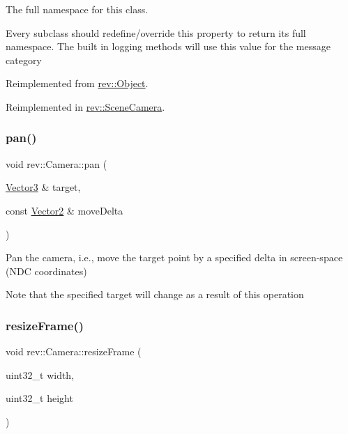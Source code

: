The full namespace for this class. 

Every subclass should redefine/override this property to return its full namespace. The built in logging methods will use this value for the message category 

Reimplemented from \mbox{\hyperlink{classrev_1_1_object_aaeb638d3e10f361c56c211a318a27f3d}{rev\+::\+Object}}.



Reimplemented in \mbox{\hyperlink{classrev_1_1_scene_camera_a8d2a68f15a75323bd1d9a5d96c7a09bc}{rev\+::\+Scene\+Camera}}.

\mbox{\label{classrev_1_1_camera_a5c894cef5f6e9f7e93be757fcceff737}} 
\subsubsection{\texorpdfstring{pan()}{pan()}}
{\footnotesize\ttfamily void rev\+::\+Camera\+::pan (\begin{DoxyParamCaption}\item[{\mbox{\hyperlink{classrev_1_1_vector}{Vector3}} \&}]{target,  }\item[{const \mbox{\hyperlink{classrev_1_1_vector}{Vector2}} \&}]{move\+Delta }\end{DoxyParamCaption})}



Pan the camera, i.\+e., move the target point by a specified delta in screen-\/space (N\+DC coordinates) 

Note that the specified target will change as a result of this operation \mbox{\label{classrev_1_1_camera_a38127b7e39468bb9116f3bcc3b3bcb1f}} 
\subsubsection{\texorpdfstring{resizeFrame()}{resizeFrame()}}
{\footnotesize\ttfamily void rev\+::\+Camera\+::resize\+Frame (\begin{DoxyParamCaption}\item[{uint32\+\_\+t}]{width,  }\item[{uint32\+\_\+t}]{height }\end{DoxyParamCaption})\hspace{0.3cm}{\ttfamily [virtual]}}



